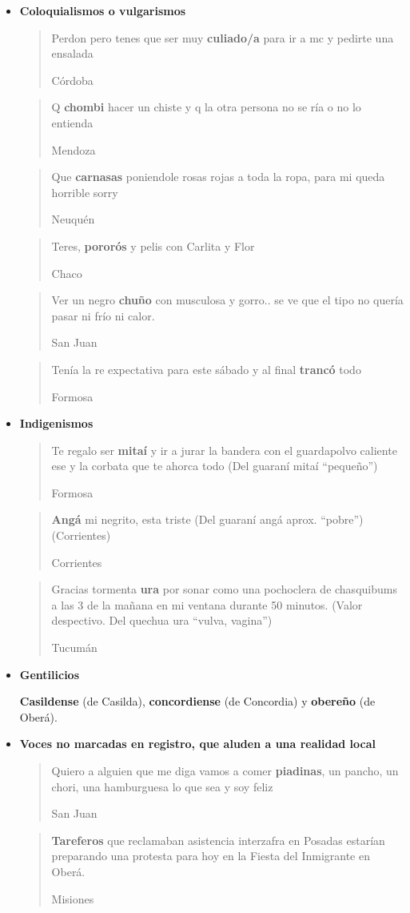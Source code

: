 \begin{itemize}
  
  \label{it:caracterizacionLinguistica}
  
  \item \textbf{Coloquialismos o vulgarismos}

    \blockquote[Córdoba]{Perdon pero tenes que ser muy \textbf{culiado/a} para ir a mc y pedirte una ensalada}


    \blockquote[Mendoza]{Q \textbf{chombi} hacer un chiste y q la otra persona no se ría o no lo entienda}

    \blockquote[Neuquén]{Que \textbf{carnasas} poniendole rosas rojas a toda la ropa, para mi queda horrible sorry}

    \blockquote[Chaco]{Teres, \textbf{pororós} y pelis con Carlita y Flor}

  \blockquote[San Juan]{Ver un negro \textbf{chuño} con musculosa y gorro.. se ve que el tipo no quería pasar ni frío ni calor.}

  \blockquote[Formosa]{Tenía la re expectativa para este sábado y al final \textbf{trancó} todo }

\item \textbf{Indigenismos}

    \blockquote[Formosa]{Te regalo ser \textbf{mitaí} y ir a jurar la bandera con el guardapolvo caliente ese y la corbata que te ahorca todo (Del guaraní mitaí “pequeño”)}

    \blockquote[Corrientes]{\textbf{Angá} mi negrito, esta triste (Del guaraní angá aprox. “pobre”) (Corrientes)}

    \blockquote[Tucumán]{Gracias tormenta \textbf{ura} por sonar como una pochoclera de chasquibums a las 3 de la mañana en mi ventana durante 50 minutos. (Valor despectivo. Del quechua ura “vulva, vagina”) }

\item \textbf{Gentilicios}

  \textbf{Casildense} (de Casilda), \textbf{concordiense} (de Concordia) y \textbf{obereño} (de Oberá).

\item \textbf{Voces no marcadas en registro, que aluden a una realidad local}

  \blockquote[San Juan]{Quiero a alguien que me diga vamos a comer \textbf{piadinas}, un pancho, un chori, una hamburguesa lo que sea y soy feliz}

  \blockquote[Misiones]{\textbf{Tareferos} que reclamaban asistencia interzafra en Posadas estarían preparando una protesta para hoy en la Fiesta del Inmigrante en Oberá.}


\end{itemize}
